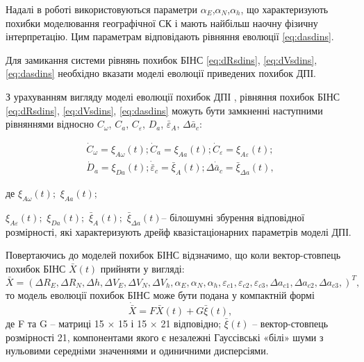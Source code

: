 Надалі в роботі використовуються параметри $\alpha_{E} $,$\alpha_{N} $,$\alpha_{h} $, 
що характеризують похибки  моделювання географічної СК і мають найбільш наочну 
фізичну інтерпретацію. Цим параметрам відповідають рівняння еволюції \eqref{eq:dasdins}.

Для замикання системи рівнянь похибок БІНС \eqref{eq:dRsdins}, \eqref{eq:dVsdins}, 
\eqref{eq:dasdins} необхідно вказати моделі еволюції приведених похибок ДПІ. 

З урахуванням вигляду моделі еволюції похибок ДПІ , 
рівняння похибок БІНС \eqref{eq:dRsdins}, \eqref{eq:dVsdins}, \eqref{eq:dasdins} 
можуть бути замкненні  наступними  рівняннями відносно 
$C_{\omega } $, $C_{a} $, $C_{\varepsilon} $, $D_{a} $, $\bar{\varepsilon }_{A} $, $\Delta \bar{a}_{c} $:

\begin{equation} \label{eq:dawsdins} \begin{array}{l} 
{\dot{C}_{\omega } =\xi_{A\omega } (t);} 
{\dot{C}_{a} =\xi_{Aa} (t);} 
{\dot{C}_{\varepsilon } =\xi_{A\varepsilon } (t);} \\
{\dot{D}_{a} =\xi_{Da}(t);} 
{\dot{\bar{\varepsilon }}_{c} =\bar{\xi}_{A} (t);} 
{\Delta \dot{\bar{a}}_{c} =\bar{\xi }_{\Delta a}(t),} \end{array} \end{equation} 
\begin{ESKDexplanation}
\item де $\xi_{A\omega } (t);$ $\xi_{Aa} (t);$\item $\xi_{A\varepsilon } (t);$ $\xi_{Da} (t);$
$\bar{\xi }_{A} (t);$ $\bar{\xi }_{\Delta a} (t)$-- білошумні збурення відповідної розмірності, 
які характеризують дрейф квазістаціонарних  параметрів моделі ДПІ. %
\end{ESKDexplanation}

Повертаючись до моделей похибок БІНС відзначимо, що коли  вектор-стовпець похибок БІНС $\bar{X}(t)$ прийняти 
у вигляді:
\[\bar{X}=(\Delta R_{E} ,\Delta R_{N} ,\Delta h,\Delta V_{E} ,\Delta V_{N} ,\Delta 
V_{h} ,\alpha_{E} ,\alpha_{N} ,\alpha_{h} ,\varepsilon_{c1} ,\varepsilon_{c2} 
,\varepsilon_{c3} ,\Delta a_{c1} ,\Delta a_{c2} ,\Delta a_{c3} ,)^{T} ,\] 
то модель еволюції похибок БІНС може бути подана у компактній формі
\begin{equation} 
\label{eq:matrix_sdins} \dot{\bar{X}}=F\bar{X}\left(t\right)+G\bar{\xi }(t), 
\end{equation} 
де F та G   --  матриці 15 $\times$ 15 і 15 $\times$ 21 відповідно; $\bar{\xi }(t)$ -- вектор-стовпець 
розмірності 21, компонентами якого є незалежні Гауссівські «білі» шуми з нульовими 
середніми значеннями и одиничними дисперсіями.


